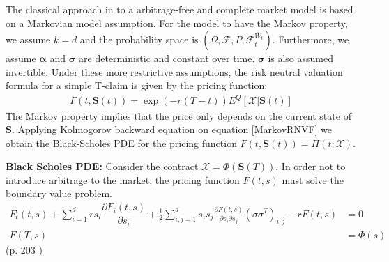 The classical approach in \parencite{B-S-Paper} to a arbitrage-free and complete market model is based on a Markovian model assumption. For the model to have the Markov property, we assume $k=d$ and the probability space is $(\Omega, \mathcal{F}, P, \mathcal{F}_t^{\bar{W}_t})$. Furthermore, we assume $\bm{\alpha}$ and $\bm{\sigma}$ are deterministic and constant over time. $\bm{\sigma}$ is also assumed invertible. Under these more restrictive assumptions, the risk neutral valuation formula for a simple T-claim is given by the pricing function:
\begin{align}\label{MarkovRNVF}
F(t,\bm{S}(t))=\exp(-r(T-t))E^Q[\mathcal{X}|\bm{S}(t)]
\end{align}
The Markov property implies that the price only depends on the current state of $\bm{S}$. Applying Kolmogorov backward equation on equation \eqref{MarkovRNVF} we obtain the Black-Scholes PDE for the pricing function $F(t,\bm{S}(t))=\Pi(t; \mathcal{X})$.

\begin{theorem}\label{BSPDEMultiDim}
\textbf{Black Scholes PDE: } Consider the contract $\mathcal{X}=\Phi(\bm{S}(T))$. In order not to introduce arbitrage to the market, the pricing function $F(t,s)$ must solve the boundary value problem.
\begin{equation*}
\begin{split}
F_t(t,s)+\sum_{i=1}^{d} rs_i \dfrac{\partial F_i(t,s)}{\partial s_i}+\frac{1}{2} \sum_{i,j=1}^{d} s_is_j \frac{\partial F(t,s)}{\partial s_i \partial s_j} (\sigma \sigma^T)_{i,j} -rF(t,s)&=0\\
F(T,s)&=\Phi(s)
\end{split}
\end{equation*}
\null \hfill (p. 203 \parencite{finKont})
\end{theorem}


